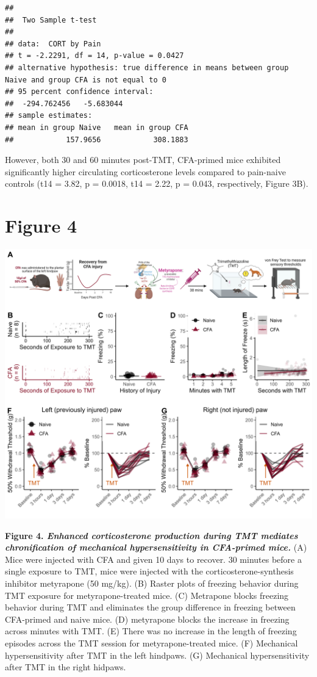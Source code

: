 \documentclass[
]{book}
\begin{document}
\begin{verbatim}
## 
##  Two Sample t-test
## 
## data:  CORT by Pain
## t = -2.2291, df = 14, p-value = 0.0427
## alternative hypothesis: true difference in means between group Naive and group CFA is not equal to 0
## 95 percent confidence interval:
##  -294.762456   -5.683044
## sample estimates:
## mean in group Naive   mean in group CFA 
##            157.9656            308.1883
\end{verbatim}

However, both 30 and 60 minutes post-TMT, CFA-primed mice exhibited significantly higher circulating corticosterone levels compared to pain-naive controls (t14 = 3.82, p = 0.0018, t14 = 2.22, p = 0.043, respectively, Figure 3B).

\chapter*{Figure 4}\label{figure-4}

\includegraphics[width=66.67in]{Figs/4_Mety_Frz_panel}

\textbf{Figure 4. \emph{Enhanced corticosterone production during TMT mediates chronification of mechanical hypersensitivity in CFA-primed mice.}} (A) Mice were injected with CFA and given 10 days to recover. 30 minutes before a single exposure to TMT, mice were injected with the corticosterone-synthesis inhibitor metyrapone (50 mg/kg). (B) Raster plots of freezing behavior during TMT exposure for metyrapone-treated mice. (C) Metrapone blocks freezing behavior during TMT and eliminates the group difference in freezing between CFA-primed and naive mice. (D) metyrapone blocks the increase in freezing across minutes with TMT. (E) There was no increase in the length of freezing episodes across the TMT session for metyrapone-treated mice. (F) Mechanical hypersensitivity after TMT in the left hindpaws. (G) Mechanical hypersensitivity after TMT in the right hidpaws.
\end{document}
